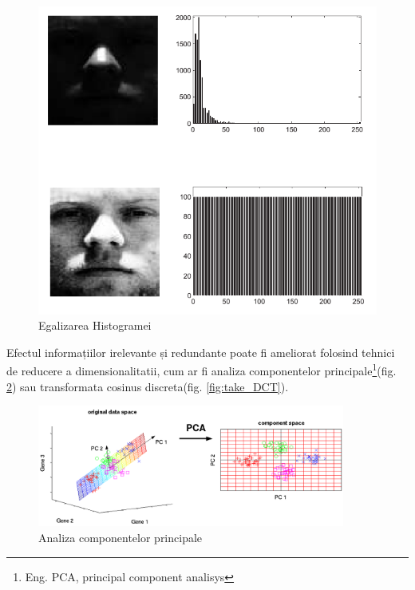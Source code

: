\begin{figure}[H]
	\includegraphics[width=1.0\textwidth]{imagini/histogram_equalization.png}
	\caption{Egalizarea Histogramei\protect\footnotemark}
	\label{fig:egalizarea_histogrameis}
\end{figure}


Efectul informațiilor irelevante și redundante poate fi ameliorat folosind tehnici de reducere a dimensionalitatii, cum ar fi analiza componentelor principale\footnote{Eng. PCA, principal component analisys}(fig. \ref{fig:fig_pca_principal_component_analysis}) sau transformata cosinus discreta(fig. \ref{fig:take_DCT}).

\begin{figure}[H]
	\centering
		\includegraphics[width=0.90\textwidth]{imagini/fig_pca_principal_component_analysis.png}
	\caption{Analiza componentelor principale\protect\footnotemark}
	\label{fig:fig_pca_principal_component_analysis}
\end{figure}

